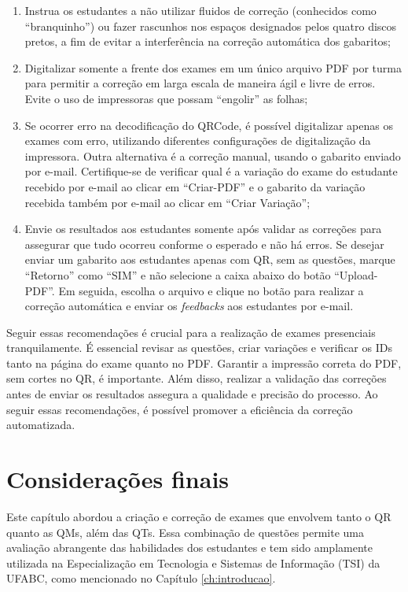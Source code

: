 \begin{enumerate}
    \item Instrua os estudantes a não utilizar fluidos de correção (conhecidos como ``branquinho'') ou fazer rascunhos nos espaços designados pelos quatro discos pretos, a fim de evitar a interferência na correção automática dos gabaritos;
    \item Digitalizar somente a frente dos exames em um único arquivo PDF por turma para permitir a correção em larga escala de maneira ágil e livre de erros. Evite o uso de impressoras que possam ``engolir'' as folhas;
    \item Se ocorrer erro na decodificação do QRCode, é possível digitalizar apenas os exames com erro, utilizando diferentes configurações de digitalização da impressora. Outra alternativa é a correção manual, usando o gabarito enviado por e-mail. Certifique-se de verificar qual é a variação do exame do estudante recebido por e-mail ao clicar em ``Criar-PDF'' e o gabarito da variação recebida também por e-mail ao clicar em ``Criar Variação'';
    \item Envie os resultados aos estudantes somente após validar as correções para assegurar que tudo ocorreu conforme o esperado e não há erros. Se desejar enviar um gabarito aos estudantes apenas com QR, sem as questões, marque ``Retorno'' como ``SIM'' e não selecione a caixa abaixo do botão ``Upload-PDF''. Em seguida, escolha o arquivo e clique no botão para realizar a correção automática e enviar os \textit{feedbacks} aos estudantes por e-mail.
\end{enumerate}

Seguir essas recomendações é crucial para a realização de exames presenciais tranquilamente. É essencial revisar as questões, criar variações e verificar os IDs tanto na página do exame quanto no PDF. Garantir a impressão correta do PDF, sem cortes no QR, é importante. Além disso, realizar a validação das correções antes de enviar os resultados assegura a qualidade e precisão do processo. Ao seguir essas recomendações, é possível promover a eficiência da correção automatizada.

\section{Considerações finais}

Este capítulo abordou a criação e correção de exames que envolvem tanto o QR quanto as QMs, além das QTs. Essa combinação de questões permite uma avaliação abrangente das habilidades dos estudantes e tem sido amplamente utilizada na Especialização em Tecnologia e Sistemas de Informação (TSI) da UFABC, como mencionado no Capítulo \ref{ch:introducao}.

